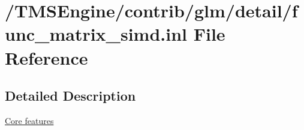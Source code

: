 \hypertarget{func__matrix__simd_8inl}{}\section{/\+T\+M\+S\+Engine/contrib/glm/detail/func\+\_\+matrix\+\_\+simd.inl File Reference}
\label{func__matrix__simd_8inl}


\subsection{Detailed Description}
\hyperlink{group__core}{Core features} 
